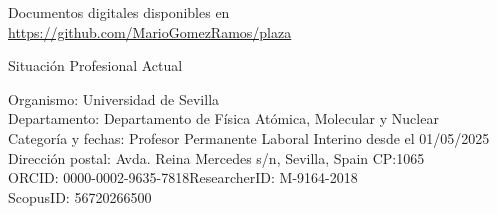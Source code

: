 \documentclass{resume2} %
\begin{document}
{\Large Documentos digitales disponibles en \url{https://github.com/MarioGomezRamos/plaza}}


\begin{rSection}{Situaci\'on Profesional Actual}

{\sc Organismo:} Universidad de Sevilla\\
{\sc Departamento:} Departamento de F\'isica At\'omica, Molecular y Nuclear\\
{\sc Categor\'ia y fechas:} Profesor Permanente Laboral Interino desde el 01/05/2025\\
{\sc Direcci\'on postal:} Avda. Reina Mercedes s/n, Sevilla, Spain CP:1065\\
{\sc ORCID:} 0000-0002-9635-7818\hfill {\sc ResearcherID:} M-9164-2018\\
{\sc ScopusID:} 56720266500
\end{rSection}

\end{document}
